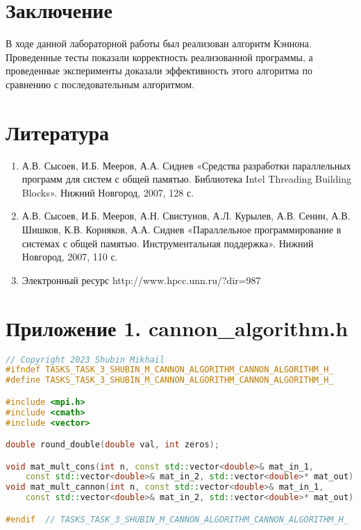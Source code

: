 \documentclass{report}
\begin{document}
\section*{Заключение}
В ходе данной лабораторной работы был реализован алгоритм Кэннона. Проведенные тесты показали корректность реализованной программы, а проведенные эксперименты доказали эффективность этого алгоритма по сравнению с последовательным алгоритмом.
\newpage

\section*{Литература}
\begin{enumerate}
\item А.В. Сысоев, И.Б. Мееров, А.А. Сиднев «Средства разработки параллельных программ для систем с общей памятью. Библиотека Intel Threading Building Blocks». Нижний Новгород, 2007, 128 с. 
\item А.В. Сысоев, И.Б. Мееров, А.Н. Свистунов, А.Л. Курылев, А.В. Сенин, А.В. Шишков, К.В. Корняков, А.А. Сиднев «Параллельное программирование в системах с общей
памятью. Инструментальная поддержка». Нижний Новгород, 2007, 110 с. 
\item Электронный ресурс http://www.hpcc.unn.ru/?dir=987
\end{enumerate}
\newpage

\section*{Приложение 1. cannon\_algorithm.h}
\begin{lstlisting}[language=C++]
// Copyright 2023 Shubin Mikhail
#ifndef TASKS_TASK_3_SHUBIN_M_CANNON_ALGORITHM_CANNON_ALGORITHM_H_
#define TASKS_TASK_3_SHUBIN_M_CANNON_ALGORITHM_CANNON_ALGORITHM_H_

#include <mpi.h>
#include <cmath>
#include <vector>

double round_double(double val, int zeros);

void mat_mult_cons(int n, const std::vector<double>& mat_in_1,
    const std::vector<double>& mat_in_2, std::vector<double>* mat_out);
void mat_mult_cannon(int n, const std::vector<double>& mat_in_1,
    const std::vector<double>& mat_in_2, std::vector<double>* mat_out);

#endif  // TASKS_TASK_3_SHUBIN_M_CANNON_ALGORITHM_CANNON_ALGORITHM_H_
\end{lstlisting}
\newpage
\end{document}
